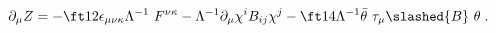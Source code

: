 \begin{equation}
\partial_\mu Z=  -\ft12 \epsilon_{\mu \nu \kappa} \Lambda^{-1}\ F^{\nu \kappa}
- \Lambda^{-1} \partial_\mu \chi^i B_{ij} \chi^j 
- \ft14  \Lambda^{-1} \bar{\theta}\ \tau_\mu \slashed{B}\ \theta
 \label{dual}\; .
\end{equation}

